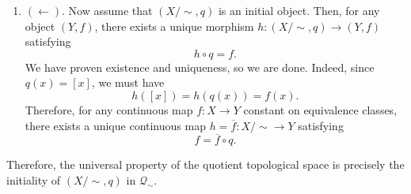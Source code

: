 \begin{example}
\begin{enumerate}
			\item $(\leftarrow)$. Now assume that $(X/{\sim}, q)$ is an initial object. Then, for any object $(Y, f)$, there exists a unique morphism $h: (X/{\sim}, q) \to (Y, f)$ satisfying
				\begin{equation}
					h \circ q = f.
				\end{equation}
				We have proven existence and uniqueness, so we are done. Indeed, since $q(x) = [x]$, we must have
				\begin{equation}
					h([x]) = h(q(x)) = f(x).
				\end{equation}
				Therefore, for any continuous map $f: X \to Y$ constant on equivalence classes, there exists a unique continuous map $h = \overline{f}: X/{\sim} \to Y$ satisfying
				\begin{equation}
					f = \overline{f} \circ q.
				\end{equation}
		\end{enumerate}
		Therefore, the universal property of the quotient topological space is precisely the initiality of $(X/{\sim},q)$ in $\mathcal{Q}_{\sim}$.
	\end{example}

